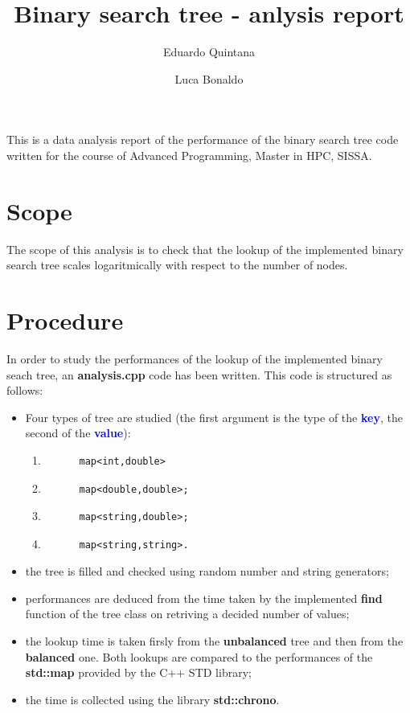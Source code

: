 \documentclass[a4paper,12pt,oneside]{article}
\begin{document}
\author{Eduardo Quintana \and Luca Bonaldo}
\title{Binary search tree - anlysis report}
\maketitle

This is a data analysis report of the performance of the binary search tree code written for the course of Advanced Programming, Master in HPC, SISSA. 

\section{Scope}
The scope of this analysis is to check that the lookup of the implemented binary search tree scales logaritmically with respect to the number of nodes.

\section{Procedure}
In order to study the performances of the lookup of the implemented binary seach tree, an \textbf{analysis.cpp} code has been written. This code is structured as follows:

\begin{itemize}
\item Four types of tree are studied (the first argument is the type of the \textbf{\textcolor{blue}{key}}, the second of the \textbf{\textcolor{blue}{value}}):
  \begin{enumerate}
  \item \begin{verbatim}
      map<int,double>
    \end{verbatim}
  \item \begin{verbatim}
      map<double,double>;
    \end{verbatim}
  \item \begin{verbatim}
      map<string,double>;
    \end{verbatim}
  \item \begin{verbatim}
      map<string,string>.
    \end{verbatim}
  \end{enumerate}
\item the tree is filled and checked using random number and string generators;
\item performances are deduced from the time taken by the implemented \textbf{find} function of the tree class on retriving a decided number of values;
\item the lookup time is taken firsly from the \textbf{unbalanced} tree and then from the \textbf{balanced} one. Both lookups are compared to the performances of the \textbf{std::map} provided by the C++ STD library;
\item the time is collected using the library \textbf{std::chrono}. 
\end{itemize}
\end{document}
